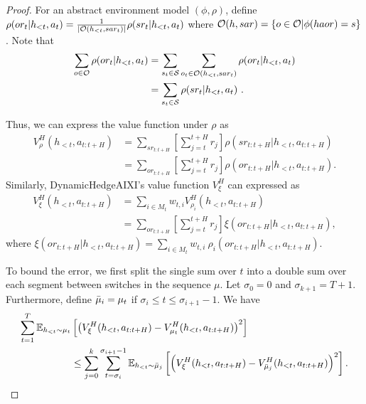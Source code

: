     \begin{proof}
        For an abstract environment model $(\phi,\rho)$, define $\rho(or_t | h_{<t}, a_t) = \frac{1}{\lvert \mathcal{O}(h_{<t},sar_t) \rvert} \rho(sr_t | h_{<t}, a_t)$ where $\mathcal{O}(h,sar) = \left\{ o \in \mathcal{O} | \phi(haor) = s \right\}$. Note that
        \begin{align*}
            \sum_{o \in \mathcal{O}} \rho(or_t | h_{<t}, a_t) &= \sum_{s_t \in \mathcal{S}} \sum_{o_t \in \mathcal{O}(h_{<t}, sar_t)} \rho(or_t | h_{<t}, a_t) \\
            &= \sum_{s_t \in \mathcal{S}} \rho(sr_t | h_{<t}, a_t)~.
        \end{align*}
    
        Thus, we can express the value function under $\rho$ as
        \begin{align*}
            V_{\rho}^{H}(h_{<t}, a_{t:t+H}) &= \sum_{sr_{t:t+H}} \left[ \sum_{j=t}^{t+H} r_j \right] \rho(sr_{t:t+H} | h_{<t}, a_{t:t+H})\\
            &= \sum_{or_{t:t+H}} \left[ \sum_{j=t}^{t+H} r_j \right] \rho(or_{t:t+H} | h_{<t}, a_{t:t+H}).
        \end{align*}
        Similarly, DynamicHedgeAIXI's value function $V_{\xi}^{H}$ can expressed as
        \begin{align*}
            V_{\xi}^{H}(h_{<t}, a_{t:t+H}) 
            &= \sum_{i \in M_t} w_{t, i} V_{\rho_i}^{H}(h_{<t}, a_{t:t+H}) \\
            &= \sum_{or_{t:t+H}} \left[ \sum_{j=t}^{t+H} r_j \right] \xi(or_{t:t+H} | h_{<t}, a_{t:t+H}),
        \end{align*}
        where $\xi(or_{t:t+H} | h_{<t}, a_{t:t+H}) = \sum_{i \in M_t} w_{t, i} ~ \rho_i(or_{t:t+H} | h_{<t}, a_{t:t+H})$.
    
        To bound the error, we first split the single sum over $t$ into a double sum over each segment between switches in the sequence $\mu$. Let $\sigma_0 = 0$ and $\sigma_{k+1} = T+1$. Furthermore, define $\bar{\mu}_i = \mu_t$ if $\sigma_i \leq t \leq \sigma_{i+1}-1$. We have
        \begin{align*}
            \sum_{t = 1}^{T} \mathbb{E}_{h_{<t} \sim \mu_t} &\left[ \left(V_{\xi}^{H}(h_{<t}, a_{t:t+H}) - V_{\mu_t}^{H}(h_{<t}, a_{t:t+H}) \right)^2 \right] \\
            &\leq
            \sum_{j=0}^{k} \sum_{t = \sigma_i}^{\sigma_{i+1}-1} \mathbb{E}_{h_{<t} \sim \bar{\mu}_j} \left[ \left( V_{\xi}^{H}(h_{<t}, a_{t:t+H}) - V_{\bar{\mu}_j}^{H}(h_{<t}, a_{t:t+H}) \right)^2 \right].
        \end{align*}
    

\end{proof}
